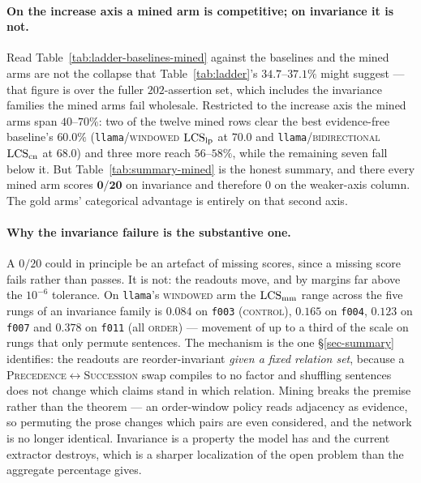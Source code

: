 \paragraph{On the increase axis a mined arm is competitive; on invariance it is not.} Read
Table~\ref{tab:ladder-baselines-mined} against the baselines and the mined arms are not the collapse
that Table~\ref{tab:ladder}'s $34.7$--$37.1\%$ might suggest --- that figure is over the fuller
$202$-assertion set, which includes the invariance families the mined arms fail wholesale. Restricted
to the increase axis the mined arms span $40$--$70\%$: two of the twelve mined rows clear the best
evidence-free baseline's $60.0\%$ (\texttt{llama}/\textsc{windowed} $\mathrm{LCS}_{\mathrm{lp}}$ at $70.0$ and
\texttt{llama}/\textsc{bidirectional} $\mathrm{LCS}_{\mathrm{cn}}$ at $68.0$) and three more reach $56$--$58\%$,
while the remaining seven fall below it. But
Table~\ref{tab:summary-mined} is the honest summary, and there every mined arm scores
$\mathbf{0/20}$ on invariance and therefore $0$ on the weaker-axis column. The gold arms' categorical
advantage is entirely on that second axis.

\paragraph{Why the invariance failure is the substantive one.}
\label{sec-mined-invariance}
A $0/20$ could in principle be an artefact of missing scores, since a missing score fails rather than
passes. It is not: the readouts move, and by margins far above the $10^{-6}$ tolerance. On
\texttt{llama}'s \textsc{windowed} arm the $\mathrm{LCS}_{\mathrm{mm}}$ range across the five rungs of an
invariance family is $0.084$ on \texttt{f003} (\textsc{control}), $0.165$ on \texttt{f004},
$0.123$ on \texttt{f007} and $0.378$ on \texttt{f011} (all \textsc{order}) --- movement of up to a
third of the scale on rungs that only permute sentences. The mechanism is the one
\S\ref{sec-summary} identifies: the readouts are reorder-invariant \emph{given a fixed relation set},
because a \textsc{Precedence}$\leftrightarrow$\textsc{Succession} swap compiles to no factor and
shuffling sentences does not change which claims stand in which relation. Mining breaks the premise
rather than the theorem --- an order-window policy reads adjacency as evidence, so permuting the prose
changes which pairs are even considered, and the network is no longer identical. Invariance is a
property the model has and the current extractor destroys, which is a sharper localization of the open
problem than the aggregate percentage gives.

